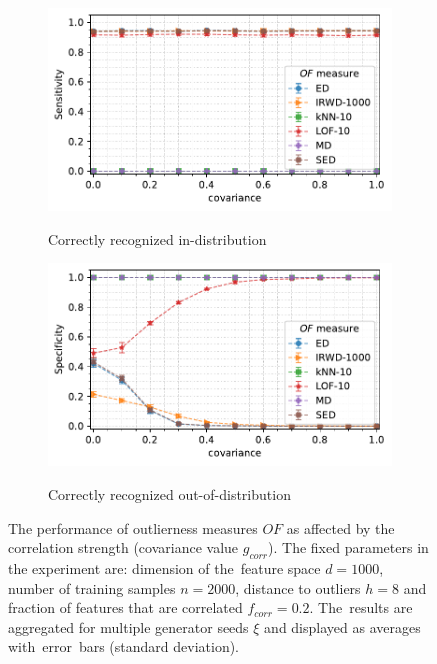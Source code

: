 \begin{figure}[t]
\begin{subfigure}[b]{0.495\textwidth}
        \centering
        \caption{\small Correctly recognized in-distribution}
        \includegraphics[width=\textwidth]{images/correlations/g_corr/trend-correlations-sens_95(covariance)-n_correlated_0.20-distance_8-outliers_correlated_False-model_ED,IRWD-1000,kNN-10,LOF-10,MD,SED-aggregated.pdf}
        \label{fig:covariance-sensitivity}
    \end{subfigure}
    \hfill
    \begin{subfigure}[b]{0.495\textwidth}
        \centering
        \caption{\small Correctly recognized out-of-distribution}
        \includegraphics[width=\textwidth]{images/correlations/g_corr/trend-correlations-spec_95(covariance)-n_correlated_0.20-distance_8-outliers_correlated_False-model_ED,IRWD-1000,kNN-10,LOF-10,MD,SED-aggregated.pdf}
        \label{fig:covariance-specificity}
    \end{subfigure}
    \caption{The performance of outlierness measures $OF$ as affected by the correlation strength (covariance value $g_{corr}$). The fixed parameters in the experiment are: dimension of the~feature space $d = 1000$, number of training samples $n = 2000$, distance to outliers $h = 8$ and fraction of features that are correlated $f_{corr} = 0.2$. The~results are aggregated for multiple generator seeds $\xi$ and displayed as averages with~error~bars (standard deviation).}
    \label{fig:covariance}
    \vspace{-2.3em}
\end{figure}


